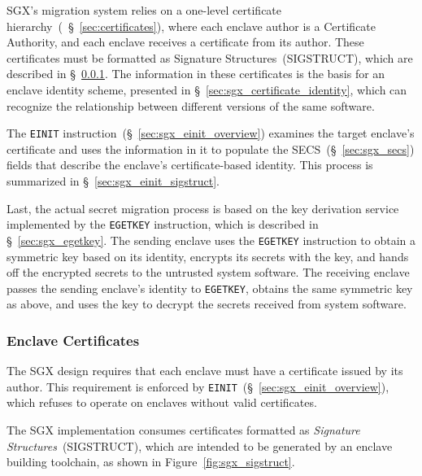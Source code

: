 SGX's migration system relies on a one-level certificate
hierarchy~(~\S~\ref{sec:certificates}), where each enclave author is a
Certificate Authority, and each enclave receives a certificate from its author.
These certificates must be formatted as Signature Structures~(SIGSTRUCT), which
are described in \S~\ref{sec:sgx_sigstruct}. The information in these
certificates is the basis for an enclave identity scheme, presented in
\S~\ref{sec:sgx_certificate_identity}, which can recognize the relationship
between different versions of the same software.

The \texttt{EINIT} instruction~(\S~\ref{sec:sgx_einit_overview}) examines the
target enclave's certificate and uses the information in it to populate
the SECS~(\S~\ref{sec:sgx_secs}) fields that describe the enclave's
certificate-based identity. This process is summarized in
\S~\ref{sec:sgx_einit_sigstruct}.

Last, the actual secret migration process is based on the key derivation
service implemented by the \texttt{EGETKEY} instruction, which is described
in \S~\ref{sec:sgx_egetkey}. The sending enclave uses the \texttt{EGETKEY}
instruction to obtain a symmetric key based on its identity, encrypts its
secrets with the key, and hands off the encrypted secrets to the untrusted
system software. The receiving enclave passes the sending enclave's identity
to \texttt{EGETKEY}, obtains the same symmetric key as above, and uses the key
to decrypt the secrets received from system software.


\subsubsection{Enclave Certificates}
\label{sec:sgx_sigstruct}
\label{sec:sgx_mrsigner}


The SGX design requires that each enclave must have a certificate issued by its
author. This requirement is enforced by
\texttt{EINIT}~(\S~\ref{sec:sgx_einit_overview}), which refuses to operate on
enclaves without valid certificates.

The SGX implementation consumes certificates formatted as
\textit{Signature Structures}~(SIGSTRUCT), which are intended to be generated
by an enclave building toolchain, as shown in Figure~\ref{fig:sgx_sigstruct}.

